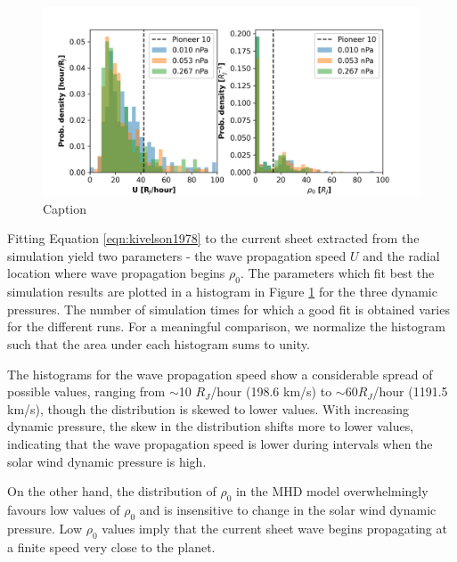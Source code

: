 \begin{figure}
    \centering
    \includegraphics[width=\textwidth]{images6/comparison_highdynP_kivelson.png}
    \caption{Caption}
    \label{fig:comparison-hist-kivelson}
\end{figure}

Fitting Equation \ref{eqn:kivelson1978} to the current sheet extracted from the simulation yield two parameters - the wave propagation speed $U$ and the radial location where wave propagation begins $\rho_0$. The parameters which fit best the simulation results are plotted in a histogram in Figure 
\ref{fig:comparison-hist-kivelson} for the three dynamic pressures. The number of simulation times for which a good fit is obtained varies for the different runs. For a meaningful comparison, we normalize the histogram such that the area under each histogram sums to unity. 

The histograms for the wave propagation speed show a considerable spread of possible values, ranging from $\sim$10 $R_J$/hour (198.6 km/s) to $\sim60 R_J$/hour (1191.5 km/s), though the distribution is skewed to lower values. With increasing dynamic pressure, the skew in the distribution shifts more to lower values, indicating that the wave propagation speed is lower during intervals when the solar wind dynamic pressure is high. 

On the other hand, the distribution of $\rho_0$ in the MHD model overwhelmingly favours low values of $\rho_0$ and is insensitive to change in the solar wind dynamic pressure. Low $\rho_0$ values imply that the current sheet wave begins propagating at a finite speed very close to the planet. 

